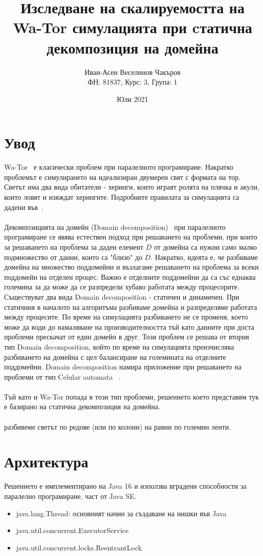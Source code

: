 \documentclass{article}
\title{Изследване на скалируемостта на Wa-Tor симулацията при cтатична декомпозиция на домейна}
\author{Иван-Асен Веселинов Чакъров \\
	ФН: 81837, Курс: 3, Група: 1}
\date{Юли 2021}
\begin{document}
\maketitle

\section{Увод}
Wa-Tor~\cite{wator} е класически проблем при паралелното програмиране.
Накратко проблемът е симулирането на идеализиран двумерен свят с формата на тор.
Светът има два вида обитатели - херинги, които играят ролята на плячка и акули, които ловят и изяждат херингите.
Подробните правилата за симулацията са дадени във~\cite{wator}.
\\
\\
Декомпозицията на домейн (Domain decomposition)~\cite{domain_decomposition}
при паралелното програмиране се явява естествен подход при решаването на проблеми,
при които за решаването на проблема за даден елемент $D$ от домейна са нужни само малко подмножество от данни,
които са "близо" до $D$. Накратко, идеята е, че разбиваме домейна на множество поддомейни
и възлагаме решаването на проблема за всеки поддомейн на отделен процес.
Важно е отделните поддомейни да са със еднаква големина за да може да се разпредели
хубаво работата между процесорите. Съществуват два вида Domain decomposition - статичен и динамичен.
При статичния в началото на алгоритъма разбиваме домейна и разпределяме работата между процесите.
По време на симулацията разбиването не се променя, което може да води до намаляване на производителността
тъй като данните при доста проблеми прескачат от един домейн в друг.
Този проблем се решава от втория тип Domain decomposition, който по време на симулацията
преизчислява разбиването на домейна с цел балансиране на големината на отделните поддомейни.
Domain decomposition намира приложение при решаването на проблеми от тип
Celular automata ~\cite{celular_automata}.
\\
\\
Тъй като и Wa-Tor попада в този тип проблеми, решението което представям тук е базирано
на статична декомпозиция на домейна.
\\
\\
разбивеме светът по редове (или по колони) на равни по големин ленти.

\section{Архитектура}
Решението е имплементирано на Java 16 и използва вградени способности за паралелно програмиране,
част от Java SE.
\begin{itemize}
	\item java.lang.Thread: основният начин за създаване на нишки във Java
	\item java.util.concurrent.ExecutorService
	\item java.util.concurrent.locks.ReentrantLock
\end{itemize}
\end{document}
